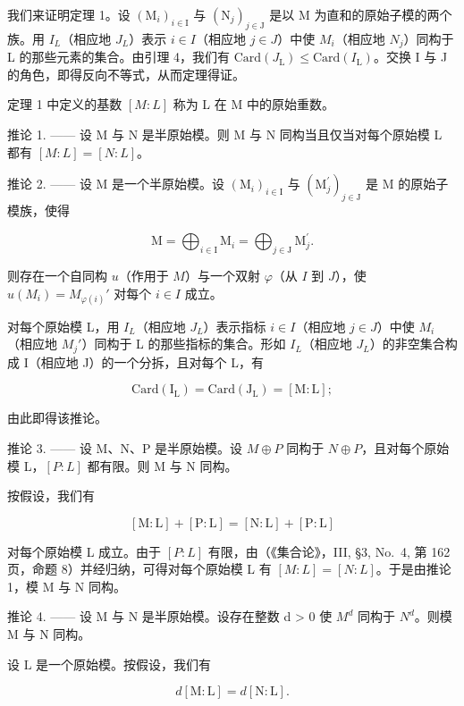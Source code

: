 我们来证明定理 1。设 \((\mathrm{M}_{i})_{i\in\mathrm{I}}\) 与 \((\mathrm{N}_{j})_{j\in\mathrm{J}}\) 是以 M 为直和的原始子模的两个族。用 \(I_{L}\)（相应地 \(J_{L}\)）表示 \(i\in I\)（相应地 \(j\in J\)）中使 \(M_{i}\)（相应地 \(N_{j}\)）同构于 L 的那些元素的集合。由引理 4，我们有 \(\mathrm{Card}(J_{\mathrm{L}})\leqslant\mathrm{Card}(I_{\mathrm{L}})\)。交换 I 与 J 的角色，即得反向不等式，从而定理得证。

定理 1 中定义的基数 \([M : L]\) 称为 L 在 M 中的原始重数。

推论 1. —— 设 M 与 N 是半原始模。则 M 与 N 同构当且仅当对每个原始模 L 都有 \([M:L]=[N:L]\)。

推论 2. —— 设 M 是一个半原始模。设 \((\mathrm{M}_{i})_{i\in\mathrm{I}}\) 与 \((\mathrm{M}_{j}^{\prime})_{j\in\mathrm{J}}\) 是 M 的原始子模族，使得

\[
\mathrm{M} = \bigoplus_ {i \in \mathrm{I}} \mathrm{M} _ {i} = \bigoplus_ {j \in \mathrm{J}} \mathrm{M} _ {j} ^ {\prime}.
\]

则存在一个自同构 \(u\)（作用于 \(M\)）与一个双射 \(\varphi\)（从 \(I\) 到 \(J\)），使 \(u(M_i) = M_{\varphi(i)}'\) 对每个 \(i \in I\) 成立。

对每个原始模 L，用 \(I_{L}\)（相应地 \(J_{L}\)）表示指标 \(i \in I\)（相应地 \(j \in J\)）中使 \(M_{i}\)（相应地 \(M_{j}'\)）同构于 L 的那些指标的集合。形如 \(I_{L}\)（相应地 \(J_{L}\)）的非空集合构成 I（相应地 J）的一个分拆，且对每个 L，有

\[
\mathrm{Card} (\mathrm {I_ {L}}) = \mathrm{Card} (\mathrm {J_ {L}}) = [ \mathrm{M:L} ];
\]

由此即得该推论。

推论 3. —— 设 M、N、P 是半原始模。设 \(M \oplus P\) 同构于 \(N \oplus P\)，且对每个原始模 L，\([P : L]\) 都有限。则 M 与 N 同构。

按假设，我们有

\[
[ \mathrm{M}: \mathrm{L} ] + [ \mathrm{P}: \mathrm{L} ] = [ \mathrm{N}: \mathrm{L} ] + [ \mathrm{P}: \mathrm{L} ]
\]

对每个原始模 L 成立。由于 \([P:L]\) 有限，由（《集合论》，III, §3, No.~4, 第 162 页，命题 8）并经归纳，可得对每个原始模 L 有 \([M:L]=[N:L]\)。于是由推论 1，模 M 与 N 同构。

推论 4. —— 设 M 与 N 是半原始模。设存在整数 d \textgreater{} 0 使 \(M^{d}\) 同构于 \(N^{d}\)。则模 M 与 N 同构。

设 \(\mathrm{L}\) 是一个原始模。按假设，我们有

\[
d [ \mathrm{M}: \mathrm{L} ] = d [ \mathrm{N}: \mathrm{L} ].
\]


